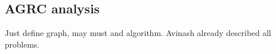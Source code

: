 
\subsection{AGRC analysis}
\label{sec:agrc-analysis}

Just define graph, may must and algorithm. Avinash already described all
problems.



